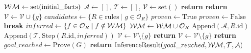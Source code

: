 \begin{algorithm}[h]
\caption{Backward Chaining Inference Engine}
\label{alg:backward_chaining}
\begin{algorithmic}[1]
    \State $\mathcal{WM} \gets \text{set}(\text{initial\_facts})$
    \State $\mathcal{A} \gets []$, $\mathcal{T} \gets []$, $\mathcal{V} \gets \text{set}()$
         \State \textbf{return}  \EndIf
         \State \textbf{return}  \EndIf
        \State $\mathcal{V} \gets \mathcal{V} \cup \{ g \}$
        \State $candidates \gets \{ R \in \text{rules} \mid g \in \mathcal{O}_R \}$
            \State $proven \gets \text{True}$
                    \State $proven \gets \text{False}$
                    \State \textbf{break}
                \EndIf
            \EndFor
                \State $inferred \gets \{ f \in \mathcal{O}_R \mid f \notin \mathcal{WM} \}$
                \State $\mathcal{WM} \gets \mathcal{WM} \cup \mathcal{O}_R$
                    \State $\text{Append}(\mathcal{A}, R.\text{id})$
                    \State $\text{Append}(\mathcal{T}, \text{Step}(R.\text{id}, inferred))$
                \EndIf
                \State $\mathcal{V} \gets \mathcal{V} \setminus \{ g \}$
                \State \textbf{return} 
            \EndIf
        \EndFor
        \State $\mathcal{V} \gets \mathcal{V} \setminus \{ g \}$
        \State \textbf{return} 
    \EndFunction
    \State $goal\_reached \gets \text{Prove}(G)$
    \State \textbf{return} $\text{InferenceResult}(goal\_reached, \mathcal{WM}, \mathcal{T}, \mathcal{A})$
\EndProcedure
\end{algorithmic}
\end{algorithm}
